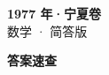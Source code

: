 \documentclass[zihao=-4, a4paper]{ctexart}
\begin{document}
\begin{center}
  {\Large\bfseries 1977 年·宁夏卷}\\[4pt]
  {\large 数学 · 简答版}
\end{center}
\medskip
{}

\clearpage
{}
\begin{center}{\Large\bfseries 答案速查}\end{center}
\medskip

\end{document}

